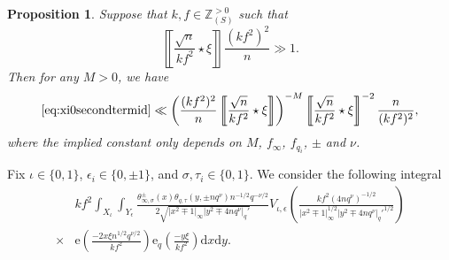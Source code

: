 \documentclass[10pt,oneside,reqno]{amsart}
\makeatletter
\newcommand\rmd{\mathrm{d}}
\newcommand\rme{\mathrm{e}}
\newcommand\ZZ{\mathbb{Z}}
\newcommand\legendresymbol[2]{\genfrac{(}{)}{}{}{#1}{#2}}
\theoremstyle{THEOREM}
\newtheorem{proposition}[theorem]{Proposition}
\theoremstyle{DEFINITION}
\theoremstyle{EXERCISE}
\numberwithin{equation}{section}
\renewenvironment{proof}[1][\proofname]{\par
  \vspace{-6pt}
  \pushQED{\qed}
  \normalfont \topsep6\p@\@plus6\p@\relax
  \trivlist
  \item[\hskip\labelsep\rmfamily\bfseries
    #1\@addpunct{:}]\ignorespaces
}{
  \popQED\endtrivlist\@endpefalse
  \vspace{-6pt}
}
\makeatother
\begin{document}
\begin{proposition}\label{prop:xi0secondterm1}
Suppose that $k,f\in \ZZ_{(S)}^{>0}$ such that
\[
\left\llbracket\frac{\sqrt{n}}{kf^2}\star \xi\right\rrbracket\frac {(kf^2)^2}{n} \gg 1.
\]
Then for any $M>0$, we have
\[
\eqref{eq:xi0secondtermid}\ll \left(\frac{(kf^2)^2}{n}\left\llbracket\frac{\sqrt{n}}{kf^2}\star \xi\right\rrbracket\right)^{-M} \left\llbracket\frac{\sqrt{n}}{kf^2}\star \xi\right\rrbracket^{-2}\frac{n}{(kf^2)^2},
\]
where the implied constant only depends on $M$, $f_\infty$, $f_{q_i}$, $\pm$ and $\nu$.
\end{proposition}
\begin{proof}
Fix $\iota\in\{0,1\}$, $\epsilon_i\in \{0,\pm 1\}$, and $\sigma,\tau_i\in \{0,1\}$. We consider the following integral
\begin{equation}\label{eq:xi0secondtermsingle}
\begin{split}
& kf^2\int_{X_\iota}\int_{Y_\epsilon}\frac{\theta_{\infty,\sigma}^\pm(x)\theta_{q,\tau}(y,\pm nq^\nu)n^{-1/2}q^{-\nu/2}}{2\sqrt{|x^2\mp 1|_\infty|y^2\mp 4nq^\nu|_q'}}V_{\iota,\epsilon}\legendresymbol{kf^2 (4nq^\nu)^{-1/2}}{|x^2\mp 1|_\infty^{1/2}|y^2\mp 4nq^\nu|_q'^{1/2}}
  \\
  \times&
  \rme\legendresymbol{-2x\xi n^{1/2}q^{\nu/2}}{kf^2}\rme_{q}\legendresymbol{-y\xi}{kf^2}\rmd x\rmd y.
\end{split}
\end{equation}


\end{proof}
\end{document}
